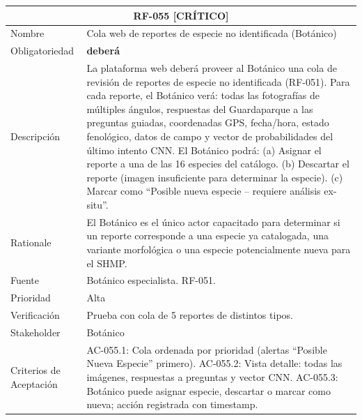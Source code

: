 \documentclass[12pt, a4paper]{article}
\newcommand{\criticomark}{\textcolor{criticolor}{\textbf{[CR\'ITICO]}}}
\begin{document}
\begin{longtable}{|p{3cm}|p{11.5cm}|}
\hline
\multicolumn{2}{|c|}{\textbf{RF-055} \criticomark} \\
\hline
Nombre & Cola web de reportes de especie no identificada (Bot\'anico) \\
\hline
Obligatoriedad & \textbf{deber\'a} \\
\hline
Descripci\'on & La plataforma web deber\'a proveer al Bot\'anico una cola de revisi\'on de reportes de especie no identificada (RF-051). Para cada reporte, el Bot\'anico ver\'a: todas las fotograf\'ias de m\'ultiples \'angulos, respuestas del Guardaparque a las preguntas guiadas, coordenadas GPS, fecha/hora, estado fenol\'ogico, datos de campo y vector de probabilidades del \'ultimo intento CNN. El Bot\'anico podr\'a:\newline
(a) Asignar el reporte a una de las 16 especies del cat\'alogo.\newline
(b) Descartar el reporte (imagen insuficiente para determinar la especie).\newline
(c) Marcar como ``Posible nueva especie -- requiere an\'alisis ex-situ''. \\
\hline
Rationale & El Bot\'anico es el \'unico actor capacitado para determinar si un reporte corresponde a una especie ya catalogada, una variante morfol\'ogica o una especie potencialmente nueva para el SHMP. \\
\hline
Fuente & Bot\'anico especialista. RF-051. \\
\hline
Prioridad & Alta \\
\hline
Verificaci\'on & Prueba con cola de 5 reportes de distintos tipos. \\
\hline
Stakeholder & Bot\'anico \\
\hline
Criterios de Aceptaci\'on &
AC-055.1: Cola ordenada por prioridad (alertas ``Posible Nueva Especie'' primero). \newline
AC-055.2: Vista detalle: todas las im\'agenes, respuestas a preguntas y vector CNN. \newline
AC-055.3: Bot\'anico puede asignar especie, descartar o marcar como nueva; acci\'on registrada con timestamp. \\
\hline
\end{longtable}
\end{document}
